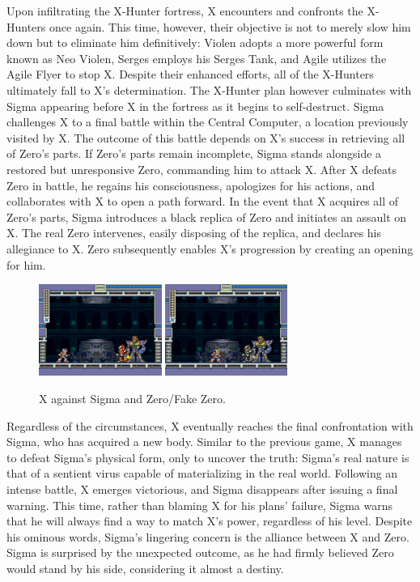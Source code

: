Upon infiltrating the X-Hunter fortress, X encounters and confronts the X-Hunters once again. This time, however, their objective is not to merely slow him down but to eliminate him definitively: Violen adopts a more powerful form known as Neo Violen, Serges employs his Serges Tank, and Agile utilizes the Agile Flyer to stop X. Despite their enhanced efforts, all of the X-Hunters ultimately fall to X's determination. The X-Hunter plan however culminates with Sigma appearing before X in the fortress as it begins to self-destruct. Sigma challenges X to a final battle within the Central Computer, a location previously visited by X. The outcome of this battle depends on X's success in retrieving all of Zero's parts.
If Zero's parts remain incomplete, Sigma stands alongside a restored but unresponsive Zero, commanding him to attack X. After X defeats Zero in battle, he regains his consciousness, apologizes for his actions, and collaborates with X to open a path forward. In the event that X acquires all of Zero's parts, Sigma introduces a black replica of Zero and initiates an assault on X. The real Zero intervenes, easily disposing of the replica, and declares his allegiance to X. Zero subsequently enables X's progression by creating an opening for him.

\begin{figure}[htp]
	\centering
	\includegraphics[height=3cm]{figures/X2/story_3_2.jpg}
	\includegraphics[height=3cm]{figures/X2/story_3.jpg}
	\caption{X against Sigma and Zero/Fake Zero.}
\end{figure}

Regardless of the circumstances, X eventually reaches the final confrontation with Sigma, who has acquired a new body. Similar to the previous game, X manages to defeat Sigma's physical form, only to uncover the truth: Sigma's real nature is that of a sentient virus capable of materializing in the real world. Following an intense battle, X emerges victorious, and Sigma disappears after issuing a final warning. This time, rather than blaming X for his plans' failure, Sigma warns that he will always find a way to match X's power, regardless of his level. Despite his ominous words, Sigma's lingering concern is the alliance between X and Zero. Sigma is surprised by the unexpected outcome, as he had firmly believed Zero would stand by his side, considering it almost a destiny.

